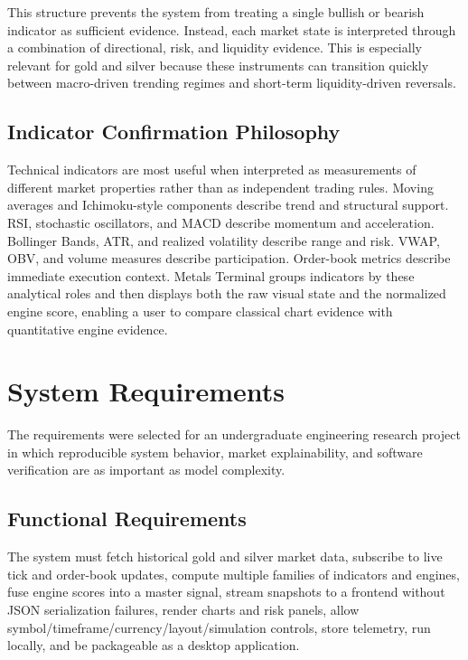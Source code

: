 \documentclass[conference]{IEEEtran}
\begin{document}
This structure prevents the system from treating a single bullish or bearish
indicator as sufficient evidence. Instead, each market state is interpreted
through a combination of directional, risk, and liquidity evidence. This is
especially relevant for gold and silver because these instruments can
transition quickly between macro-driven trending regimes and short-term
liquidity-driven reversals.

\subsection{Indicator Confirmation Philosophy}

Technical indicators are most useful when interpreted as measurements of
different market properties rather than as independent trading rules. Moving
averages and Ichimoku-style components describe trend and structural support.
RSI, stochastic oscillators, and MACD describe momentum and acceleration.
Bollinger Bands, ATR, and realized volatility describe range and risk. VWAP,
OBV, and volume measures describe participation. Order-book metrics describe
immediate execution context. Metals Terminal groups indicators by these
analytical roles and then displays both the raw visual state and the
normalized engine score, enabling a user to compare classical chart evidence
with quantitative engine evidence.

\section{System Requirements}

The requirements were selected for an undergraduate engineering research
project in which reproducible system behavior, market explainability, and
software verification are as important as model complexity.

\subsection{Functional Requirements}

The system must fetch historical gold and silver market data, subscribe to
live tick and order-book updates, compute multiple families of indicators and
engines, fuse engine scores into a master signal, stream snapshots to a
frontend without JSON serialization failures, render charts and risk panels,
allow symbol/timeframe/currency/layout/simulation controls, store telemetry,
run locally, and be packageable as a desktop application.
\end{document}
